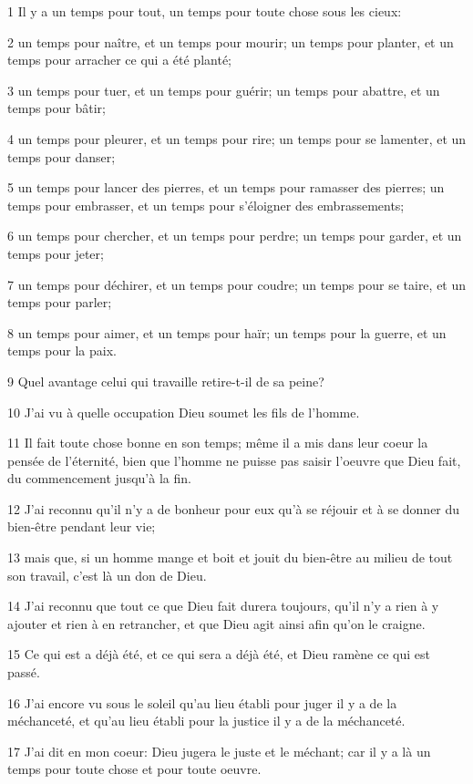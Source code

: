\par 1 Il y a un temps pour tout, un temps pour toute chose sous les cieux:
\par 2 un temps pour naître, et un temps pour mourir; un temps pour planter, et un temps pour arracher ce qui a été planté;
\par 3 un temps pour tuer, et un temps pour guérir; un temps pour abattre, et un temps pour bâtir;
\par 4 un temps pour pleurer, et un temps pour rire; un temps pour se lamenter, et un temps pour danser;
\par 5 un temps pour lancer des pierres, et un temps pour ramasser des pierres; un temps pour embrasser, et un temps pour s'éloigner des embrassements;
\par 6 un temps pour chercher, et un temps pour perdre; un temps pour garder, et un temps pour jeter;
\par 7 un temps pour déchirer, et un temps pour coudre; un temps pour se taire, et un temps pour parler;
\par 8 un temps pour aimer, et un temps pour haïr; un temps pour la guerre, et un temps pour la paix.
\par 9 Quel avantage celui qui travaille retire-t-il de sa peine?
\par 10 J'ai vu à quelle occupation Dieu soumet les fils de l'homme.
\par 11 Il fait toute chose bonne en son temps; même il a mis dans leur coeur la pensée de l'éternité, bien que l'homme ne puisse pas saisir l'oeuvre que Dieu fait, du commencement jusqu'à la fin.
\par 12 J'ai reconnu qu'il n'y a de bonheur pour eux qu'à se réjouir et à se donner du bien-être pendant leur vie;
\par 13 mais que, si un homme mange et boit et jouit du bien-être au milieu de tout son travail, c'est là un don de Dieu.
\par 14 J'ai reconnu que tout ce que Dieu fait durera toujours, qu'il n'y a rien à y ajouter et rien à en retrancher, et que Dieu agit ainsi afin qu'on le craigne.
\par 15 Ce qui est a déjà été, et ce qui sera a déjà été, et Dieu ramène ce qui est passé.
\par 16 J'ai encore vu sous le soleil qu'au lieu établi pour juger il y a de la méchanceté, et qu'au lieu établi pour la justice il y a de la méchanceté.
\par 17 J'ai dit en mon coeur: Dieu jugera le juste et le méchant; car il y a là un temps pour toute chose et pour toute oeuvre.
